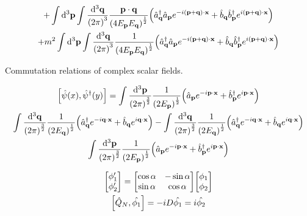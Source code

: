 \documentclass{report}
\begin{document}
\begin{subquests}
\begin{gather*}
		+ \int\dd^3{\vb p}\int\frac{\dd^3{\vb q}}{\pqty{2\pi}^3}\frac{\vb p \cdot \vb q}{\pqty{4E_{\vb p}E_{\vb q}}^{\frac{1}{2}}}\pqty{\hat{a}^{\dagger}_{\vb q}\hat{a}_{\vb p}e^{-i(\vb p+\vb q)\cdot \vb x} + \hat{b}_{\vb q}\hat{b}^{\dagger}_{\vb p}e^{i(\vb p+\vb q)\cdot \vb x}} \\
		+ m^2 \int\dd^3{\vb p}\int\frac{\dd^3{\vb q}}{\pqty{2\pi}^3}\frac{1}{\pqty{4E_{\vb p}E_{\vb q}}^{\frac{1}{2}}}\pqty{\hat{a}^{\dagger}_{\vb q}\hat{a}_{\vb p}e^{-i(\vb p+\vb q)\cdot \vb x} + \hat{b}_{\vb q}\hat{b}^{\dagger}_{\vb p}e^{i(\vb p+\vb q)\cdot \vb x}}
	\end{gather*}

	\item Commutation relations of complex scalar fields.
	\begin{subquests}
		\item
		\begin{gather*}
			\bqty{\hat{\psi}(x),\hat{\psi}^{\dagger}(y)} = \int\frac{\dd^3{\vb p}}{\pqty{2\pi}^{\frac{3}{2}}}\frac{1}{\pqty{2E_{\vb p}}^{\frac{1}{2}}}\pqty{\hat{a}_{\vb p}e^{-i\vb p\cdot \vb x} + \hat{b}^{\dagger}_{\vb p}e^{i\vb p\cdot \vb x}}\\
			\int\frac{\dd^3{\vb q}}{\pqty{2\pi}^{\frac{3}{2}}}\frac{1}{\pqty{2E_{\vb q}}^{\frac{1}{2}}}\pqty{\hat{a}^{\dagger}_{\vb q}e^{-i\vb q\cdot \vb x} + \hat{b}_{\vb q}e^{i\vb q\cdot \vb x}} - \int\frac{\dd^3{\vb q}}{\pqty{2\pi}^{\frac{3}{2}}}\frac{1}{\pqty{2E_{\vb q}}^{\frac{1}{2}}}\pqty{\hat{a}^{\dagger}_{\vb q}e^{-i\vb q\cdot \vb x} + \hat{b}_{\vb q}e^{i\vb q\cdot \vb x}}\\
			\int\frac{\dd^3{\vb p}}{\pqty{2\pi}^{\frac{3}{2}}}\frac{1}{\pqty{2E_{\vb p}}^{\frac{1}{2}}}\pqty{\hat{a}_{\vb p}e^{-i\vb p\cdot \vb x} + \hat{b}^{\dagger}_{\vb p}e^{i\vb p\cdot \vb x}}
		\end{gather*}

		\item

	\end{subquests}
	
	\item
	\begin{subquests}
		\item
		\begin{gather*}
			\mqty[
				\phi_1' \\
				\phi_2' 
			]
			= \mqty[
				\cos\alpha & -\sin\alpha \\
				\sin\alpha & \cos\alpha \\
			]\mqty[
				\phi_1 \\
				\phi_2
			] \\
			\bqty{\hat{Q}_N, \hat{\phi_1}} = -iD\hat{\phi_1} = i\hat{\phi_2}
		\end{gather*}


\end{subquests}
\end{subquests}
\end{document}
